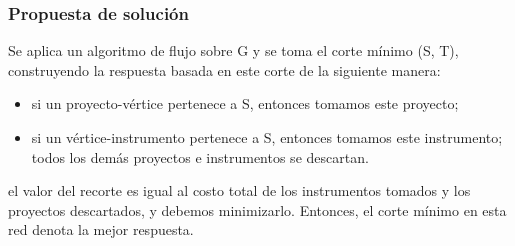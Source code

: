 \documentclass[10pt]{article} %
\begin{document}
%	
%	
%	
%	
	
	\subsubsection{Propuesta de soluci\'on}
	
	Se aplica un algoritmo de flujo sobre G y se toma el corte m\'inimo (S, T), construyendo la respuesta basada en este corte de la siguiente manera: 
	\begin{itemize}
		\item si un proyecto-vértice pertenece a S, entonces tomamos este proyecto;
		\item si un vértice-instrumento pertenece a S, entonces tomamos este instrumento; todos los demás proyectos e instrumentos se descartan. 
	\end{itemize}
	 
	 el valor del recorte es igual al costo total de los instrumentos tomados y los proyectos descartados, y debemos minimizarlo. Entonces, el corte mínimo en esta red denota la mejor respuesta.
	
\end{document}
